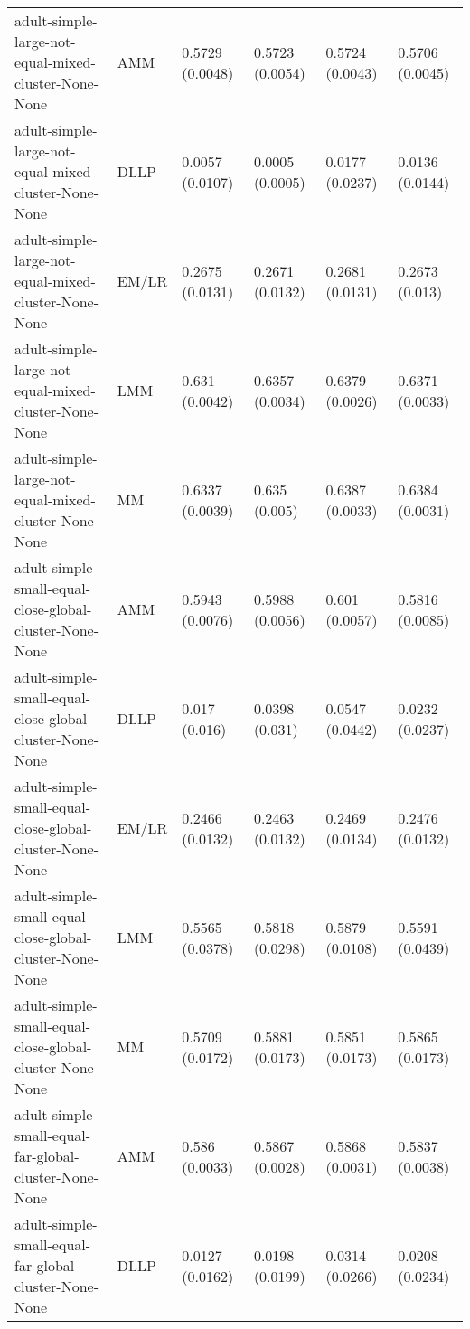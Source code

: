 \begin{longtable}{llllll}
                                   adult-simple-large-not-equal-mixed-cluster-None-None &       AMM & 0.5729 (0.0048) &  0.5723 (0.0054) &   0.5724 (0.0043) &     0.5706 (0.0045) \\
                                   adult-simple-large-not-equal-mixed-cluster-None-None &      DLLP & 0.0057 (0.0107) &  0.0005 (0.0005) &   0.0177 (0.0237) &     0.0136 (0.0144) \\
                                   adult-simple-large-not-equal-mixed-cluster-None-None &     EM/LR & 0.2675 (0.0131) &  0.2671 (0.0132) &   0.2681 (0.0131) &      0.2673 (0.013) \\
                                   adult-simple-large-not-equal-mixed-cluster-None-None &       LMM &  0.631 (0.0042) &  0.6357 (0.0034) &   0.6379 (0.0026) &     0.6371 (0.0033) \\
                                   adult-simple-large-not-equal-mixed-cluster-None-None &        MM & 0.6337 (0.0039) &    0.635 (0.005) &   0.6387 (0.0033) &     0.6384 (0.0031) \\
                                adult-simple-small-equal-close-global-cluster-None-None &       AMM & 0.5943 (0.0076) &  0.5988 (0.0056) &    0.601 (0.0057) &     0.5816 (0.0085) \\
                                adult-simple-small-equal-close-global-cluster-None-None &      DLLP &   0.017 (0.016) &   0.0398 (0.031) &   0.0547 (0.0442) &     0.0232 (0.0237) \\
                                adult-simple-small-equal-close-global-cluster-None-None &     EM/LR & 0.2466 (0.0132) &  0.2463 (0.0132) &   0.2469 (0.0134) &     0.2476 (0.0132) \\
                                adult-simple-small-equal-close-global-cluster-None-None &       LMM & 0.5565 (0.0378) &  0.5818 (0.0298) &   0.5879 (0.0108) &     0.5591 (0.0439) \\
                                adult-simple-small-equal-close-global-cluster-None-None &        MM & 0.5709 (0.0172) &  0.5881 (0.0173) &   0.5851 (0.0173) &     0.5865 (0.0173) \\
                                  adult-simple-small-equal-far-global-cluster-None-None &       AMM &  0.586 (0.0033) &  0.5867 (0.0028) &   0.5868 (0.0031) &     0.5837 (0.0038) \\
                                  adult-simple-small-equal-far-global-cluster-None-None &      DLLP & 0.0127 (0.0162) &  0.0198 (0.0199) &   0.0314 (0.0266) &     0.0208 (0.0234) \\

\end{longtable}

